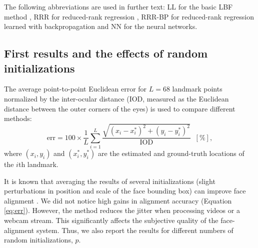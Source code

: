 \documentclass{article}
\begin{document}
		The following abbreviations are used in further text:
		LL for the basic LBF method \cite{lbf}, RRR for reduced-rank regression \cite{rrr}, RRR-BP for reduced-rank regression learned with backpropagation and NN for the neural networks.

	\subsection{First results and the effects of random initializations}
		The average point-to-point Euclidean error for $L=68$ landmark points normalized by the inter-ocular distance
		(IOD, measured as the Euclidean distance between the outer corners of the eyes) is used to compare different methods:
		\begin{equation}\label{eq:err}
			\text{err}=
			100\times\frac{1}{L}\sum_{i=1}^L\frac{\sqrt{(x_i-x_i^*)^2 + (y_i-y_i^*)^2}}{\text{IOD}}
			\;\;[\%]
			,
		\end{equation}
		where $(x_i, y_i)$ and $(x_i^*, y_i^*)$ are the estimated and ground-truth locations of the $i$th landmark.

		It is known that averaging the results of several initializations (slight perturbations in position and scale of the face bounding box) can improve face alignment \cite{microsoft_face_align}.
		We did not notice high gains in alignment accuracy (Equation \eqref{eq:err}).
		However, the method reduces the jitter when processing videos or a webcam stream.
		This significantly affects the subjective quality of the face-alignment system.
		Thus, we also report the results for different numbers of random initializations, $p$.
\end{document}
